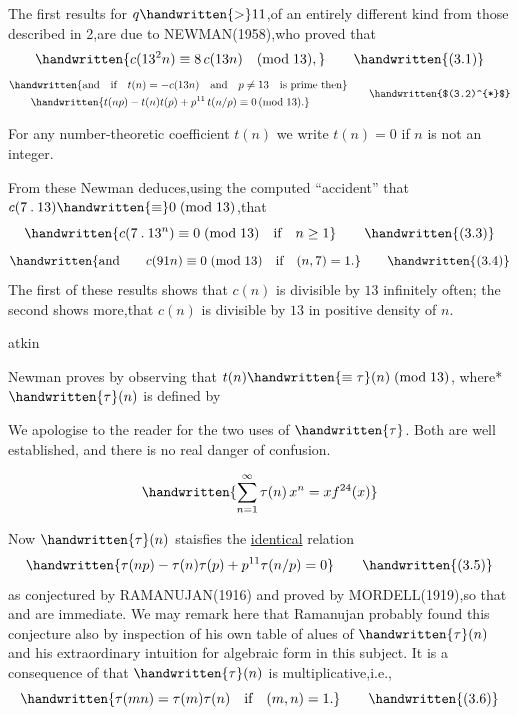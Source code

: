 \noindent The first results for $q\handwritten{>}11$,of an entirely different kind from those described in \handwritten{\S}2,are due to NEWMAN(1958),who proved that
\[
\handwritten{c(13^{2}n)\equiv8\,c(13n)\quad(\mathrm{mod}\;13),}
\tag*{\handwritten{(3.1)}}
\]
\[
\begin{aligned}
&\handwritten{\text{and}\quad\text{if}\quad t(n)=-c(13n)\quad\text{and}\quad p\ne13\quad\text{is prime then}}\\
&\qquad\handwritten{t(np)-t(n)t(p)+p^{11}\,t(n/p)\equiv0\,(\mathrm{mod}\;13).}
\end{aligned}
\tag*{\handwritten{$(3.2)^{*}$}}
\]

\noindent\handwritten{\rule{\linewidth}{0.4pt}}

\noindent *For any number-theoretic coefficient \uline{$t(n)$} we write $t(n)=0$ if \uline{$n$} is not an integer.

\noindent\handwritten{\rule{\linewidth}{0.4pt}}

From these Newman deduces,using the computed ``accident'' that $c(7\mathbin{.}13)\handwritten{\equiv}0\;(\mathrm{mod}\;13)$,that
\[
\handwritten{c(7\mathbin{.}13^{n})\equiv0\;(\mathrm{mod}\;13)\quad \text{if}\quad n\geq1}
\tag*{\handwritten{(3.3)}}
\]
\[
\handwritten{\text{and}\qquad c(91n)\equiv0\;(\mathrm{mod}\;13)\quad \text{if}\quad(n,7)=1.}
\tag*{\handwritten{(3.4)}}
\]
The first of these results shows that \uline{$c(n)$} is divisible by $13$ infinitely often; the second shows more,that \uline{$c(n)$} is divisible by $13$ in positive density of \uline{$n$}.

\noindent\hfill atkin 

Newman proves  by observing that $t(n)\handwritten{\equiv\tau}(n)\;(\mathrm{mod}\;13)$, where* $\handwritten{\tau}(n)$ is defined by

\noindent\handwritten{\rule{\linewidth}{0.4pt}}

\noindent *We apologise to the reader for the two uses of $\handwritten{\tau}$. Both are well established, and there is no real danger of confusion.

\noindent\handwritten{\rule{\linewidth}{0.4pt}}

\[
\handwritten{\sum_{n=1}^{\infty}\tau(n)\,x^{n}=xf^{24}(x)}
\]

Now $\handwritten{\tau}(n)$ staisfies the \uline{identical} relation
\[
\handwritten{\tau(np)-\tau(n)\tau(p)+p^{11}\tau(n/p)=0}
\tag*{\handwritten{(3.5)}}
\]
as conjectured by RAMANUJAN(1916) and proved by MORDELL(1919),so that  and  are immediate. We may remark here that Ramanujan probably found this conjecture also by inspection of his own table of alues of $\handwritten{\tau}(n)$ and his extraordinary intuition for algebraic form in this subject. It is a consequence of  that $\handwritten{\tau}(n)$ is multiplicative,i.e.,
\[
\handwritten{\tau(mn)=\tau(m)\tau(n)\quad\text{if}\quad (m,n)=1.}
\tag*{\handwritten{(3.6)}}
\]

